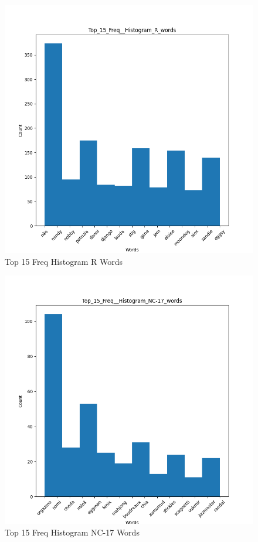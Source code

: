 \documentclass[a4paper]{article}
\begin{document}
\begin{figure}[ht]
    \centering
    \includegraphics[width=1\textwidth]{../stats/Top_15_Freq__Histogram_R_Words.png}
    \caption{Top 15 Freq Histogram R Words}
\end{figure}

\begin{figure}[ht]
    \centering
    \includegraphics[width=1\textwidth]{../stats/Top_15_Freq__Histogram_NC-17_Words.png}
    \caption{Top 15 Freq Histogram NC-17 Words}
\end{figure}
\end{document}
